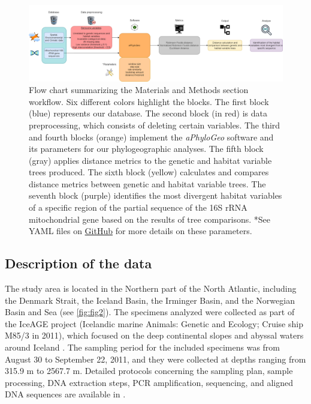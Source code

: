 \begin{figure}[htbp]
    \centering
    \includegraphics[width=\textwidth]{diagram.drawio.png}
    \caption{Flow chart summarizing the Materials and Methods section workflow. Six different colors highlight the blocks. The first block (blue) represents our database. The second block (in red) is data preprocessing, which consists of deleting certain variables. The third and fourth blocks (orange) implement the \textit{aPhyloGeo} software and its parameters for our phylogeographic analyses. The fifth block (gray) applies distance metrics to the genetic and habitat variable trees produced. The sixth block (yellow) calculates and compares distance metrics between genetic and habitat variable trees. The seventh block (purple) identifies the most divergent habitat variables of a specific region of the partial sequence of the 16S rRNA mitochondrial gene based on the results of tree comparisons. *See YAML files on \href{https://github.com/tahiri-lab/aPhyloGeo}{GitHub} for more details on these parameters. \label{fig:fig1}}
\end{figure}

\subsection{Description of the data}
The study area is located in the Northern part of the North Atlantic, including the Denmark Strait, the Iceland Basin, the Irminger Basin, and the Norwegian Basin and Sea (see \autoref{fig:fig2}). The specimens analyzed were collected as part of the IceAGE project (Icelandic marine Animals: Genetic and Ecology; Cruise ship M85/3 in 2011), which focused on the deep continental slopes and abyssal waters around Iceland \citep{meisner_prefacebiodiversity_2018}. The sampling period for the included specimens was from August 30 to September 22, 2011, and they were collected at depths ranging from 315.9 m to 2567.7 m. Detailed protocols concerning the sampling plan, sample processing, DNA extraction steps, PCR amplification, sequencing, and aligned DNA sequences are available in \citep{uhlir_adding_2021}.

